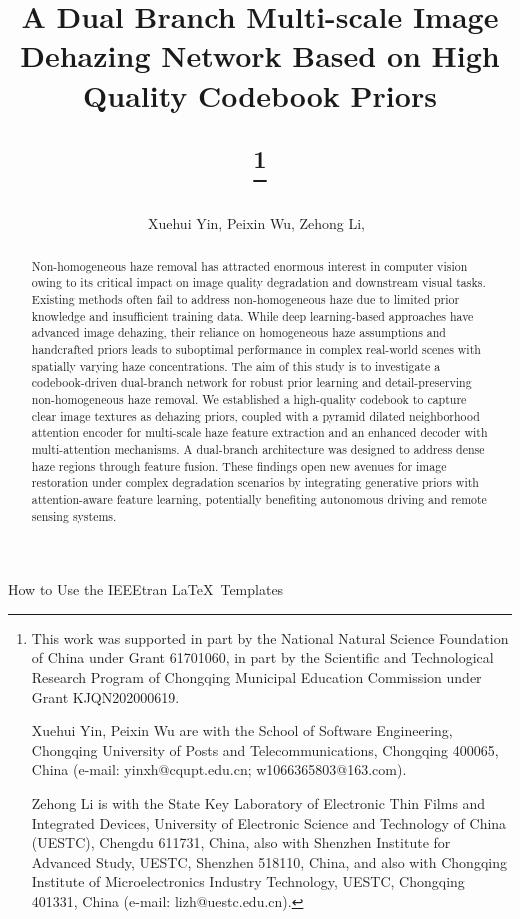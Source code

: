 \documentclass[journal]{IEEEtran}
\begin{document}
\title{A Dual Branch Multi-scale Image Dehazing Network Based on High Quality Codebook Priors
	\author{Xuehui Yin, Peixin Wu, Zehong Li,~}
	\thanks{This work was supported in part by the National Natural Science Foundation of China under Grant 61701060, in part by the Scientific and Technological Research Program of Chongqing Municipal Education Commission under Grant KJQN202000619.

		Xuehui Yin, Peixin Wu are with the School of Software Engineering, Chongqing University of Posts and Telecommunications, Chongqing 400065, China (e-mail: yinxh@cqupt.edu.cn; w1066365803@163.com).

		Zehong Li is with the State Key Laboratory of Electronic Thin Films and Integrated Devices, University of Electronic Science and Technology of China (UESTC), Chengdu 611731, China, also with Shenzhen Institute for Advanced Study, UESTC, Shenzhen 518110, China, and also with Chongqing Institute of Microelectronics Industry Technology, UESTC, Chongqing 401331, China (e-mail: lizh@uestc.edu.cn).
	}}

%
{How to Use the IEEEtran \LaTeX \ Templates}

\maketitle

\begin{abstract}
	Non-homogeneous haze removal has attracted enormous interest in computer vision owing to its critical impact on image quality degradation and downstream visual tasks. Existing methods often fail to address non-homogeneous haze due to limited prior knowledge and insufficient training data. While deep learning-based approaches have advanced image dehazing, their reliance on homogeneous haze assumptions and handcrafted priors leads to suboptimal performance in complex real-world scenes with spatially varying haze concentrations. The aim of this study is to investigate a codebook-driven dual-branch network for robust prior learning and detail-preserving non-homogeneous haze removal. We established a high-quality codebook to capture clear image textures as dehazing priors, coupled with a pyramid dilated neighborhood attention encoder for multi-scale haze feature extraction and an enhanced decoder with multi-attention mechanisms. A dual-branch architecture was designed to address dense haze regions through feature fusion. These findings open new avenues for image restoration under complex degradation scenarios by integrating generative priors with attention-aware feature learning, potentially benefiting autonomous driving and remote sensing systems.
\end{abstract}
\end{document}
